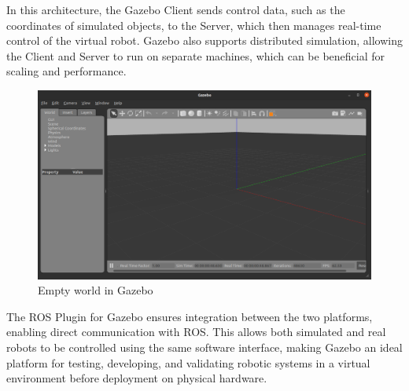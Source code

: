 \documentclass[../../main]{subfiles}
\begin{document}
In this architecture, the Gazebo Client sends control data, such as the coordinates of simulated objects, 
to the Server, which then manages real-time control of the virtual robot. Gazebo also supports distributed simulation, 
allowing the Client and Server to run on separate machines, which can be beneficial for scaling and performance.

\begin{figure}[H]
    \centering
\includegraphics[width=\textwidth]{fig/gazebo_empty_world.png}
\caption{Empty world in Gazebo}
\label{Gazebo empty world} %
\end{figure}

The ROS Plugin for Gazebo ensures  integration between the two platforms, enabling direct communication with ROS. 
This allows both simulated and real robots to be controlled using the same software interface, making Gazebo an ideal platform for testing, 
developing, and validating robotic systems in a virtual environment before deployment on physical hardware.
\end{document}
